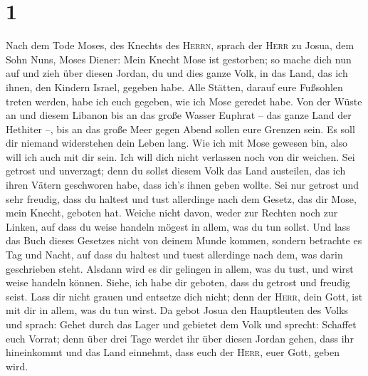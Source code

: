 \hypertarget{section}{%
\section{1}\label{section}}

 Nach dem Tode Moses, des Knechts des \textsc{Herrn},
sprach der \textsc{Herr} zu Josua, dem Sohn Nuns, Moses Diener:
 Mein Knecht Mose ist gestorben; so mache dich nun auf und
zieh über diesen Jordan, du und dies ganze Volk, in das Land, das ich
ihnen, den Kindern Israel, gegeben habe.  Alle Stätten,
darauf eure Fußsohlen treten werden, habe ich euch gegeben, wie ich Mose
geredet habe.  Von der Wüste an und diesem Libanon bis an
das große Wasser Euphrat -- das ganze Land der Hethiter --, bis an das
große Meer gegen Abend sollen eure Grenzen sein.  Es soll
dir niemand widerstehen dein Leben lang. Wie ich mit Mose gewesen bin,
also will ich auch mit dir sein. Ich will dich nicht verlassen noch von
dir weichen.  Sei getrost und unverzagt; denn du sollst
diesem Volk das Land austeilen, das ich ihren Vätern geschworen habe,
dass ich's ihnen geben wollte.  Sei nur getrost und sehr
freudig, dass du haltest und tust allerdinge nach dem Gesetz, das dir
Mose, mein Knecht, geboten hat. Weiche nicht davon, weder zur Rechten
noch zur Linken, auf dass du weise handeln mögest in allem, was du tun
sollst.  Und lass das Buch dieses Gesetzes nicht von
deinem Munde kommen, sondern betrachte es Tag und Nacht, auf dass du
haltest und tuest allerdinge nach dem, was darin geschrieben steht.
Alsdann wird es dir gelingen in allem, was du tust, und wirst weise
handeln können.  Siehe, ich habe dir geboten, dass du
getrost und freudig seist. Lass dir nicht grauen und entsetze dich
nicht; denn der \textsc{Herr}, dein Gott, ist mit dir in allem, was du
tun wirst.  Da gebot Josua den Hauptleuten des Volks und
sprach:  Gehet durch das Lager und gebietet dem Volk und
sprecht: Schaffet euch Vorrat; denn über drei Tage werdet ihr über
diesen Jordan gehen, dass ihr hineinkommt und das Land einnehmt, dass
euch der \textsc{Herr}, euer Gott, geben wird.

